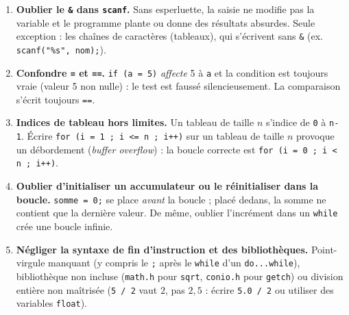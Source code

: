 \documentclass[11pt]{article}
\begin{document}
\begin{attention}
\begin{enumerate}
\item \textbf{Oublier le \texttt{\&} dans \texttt{scanf}.} Sans esperluette, la saisie ne modifie pas la variable et le programme plante ou donne des résultats absurdes. Seule exception : les chaînes de caractères (tableaux), qui s'écrivent sans \texttt{\&} (ex. \texttt{scanf("\%s", nom);}).
\item \textbf{Confondre \texttt{=} et \texttt{==}.} \texttt{if (a = 5)} \emph{affecte} 5 à \texttt{a} et la condition est toujours vraie (valeur 5 non nulle) : le test est faussé silencieusement. La comparaison s'écrit toujours \texttt{==}.
\item \textbf{Indices de tableau hors limites.} Un tableau de taille $n$ s'indice de \texttt{0} à \texttt{n-1}. Écrire \texttt{for (i = 1 ; i <= n ; i++)} sur un tableau de taille $n$ provoque un débordement (\emph{buffer overflow}) : la boucle correcte est \texttt{for (i = 0 ; i < n ; i++)}.
\item \textbf{Oublier d'initialiser un accumulateur ou le réinitialiser dans la boucle.} \texttt{somme = 0;} se place \emph{avant} la boucle ; placé dedans, la somme ne contient que la dernière valeur. De même, oublier l'incrément dans un \texttt{while} crée une boucle infinie.
\item \textbf{Négliger la syntaxe de fin d'instruction et des bibliothèques.} Point-virgule manquant (y compris le \texttt{;} après le \texttt{while} d'un \texttt{do...while}), bibliothèque non incluse (\texttt{math.h} pour \texttt{sqrt}, \texttt{conio.h} pour \texttt{getch}) ou division entière non maîtrisée (\texttt{5 / 2} vaut $2$, pas $2{,}5$ : écrire \texttt{5.0 / 2} ou utiliser des variables \texttt{float}).
\end{enumerate}
\end{attention}
\end{document}
